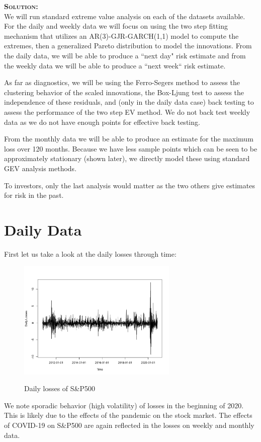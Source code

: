 \documentclass[12pt,oneside]{article}
\newenvironment{solution}
    {\textbf{\textsc{Solution:}}\\}
    {\newpage}
\begin{document}
\begin{solution}
We will run standard extreme value analysis on each of the datasets available. For the daily and weekly data we will focus on using the two step fitting mechanism that utilizes an AR(3)-GJR-GARCH(1,1) model to compute the extremes, then a generalized Pareto distribution to model the innovations. From the daily data, we will be able to produce a ``next day" risk estimate and from the weekly data we will be able to produce a ``next week`` risk estimate.


As far as diagnostics, we will be using the Ferro-Segers method to assess the clustering behavior of the scaled innovations, the Box-Ljung test to assess the independence of these residuals, and (only in the daily data case) back testing to assess the performance of the two step EV method. We do not back test weekly data as we do not have enough points for effective back testing.

From the monthly data we will be able to produce an estimate for the maximum loss over 120 months. Because we have less sample points which can be seen to be approximately stationary (shown later), we directly model these using standard GEV analysis methods.

To investors, only the last analysis would matter as the two others give estimates for risk in the past.


\section*{Daily Data}
First let us take a look at the daily losses through time:
\begin{figure}[H]
\begin{center}
{\includegraphics[width=3in]{Assignments/a4/day-data.png}}
\caption{Daily losses of S\&P500 }
\end{center}
\end{figure}
We note sporadic behavior (high volatility) of losses in the beginning of 2020. This is likely due to the effects of the pandemic on the stock market. The effects of COVID-19 on S\&P500 are again reflected in the losses on weekly and monthly data. 


\end{solution}
\end{document}
